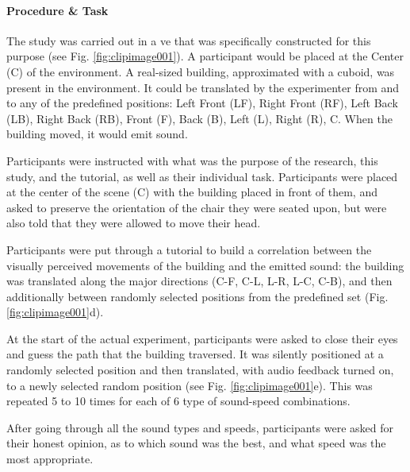\paragraph{Procedure \& Task}
The study was carried out in a \gls{ve} that was specifically constructed for this purpose (see Fig. \ref{fig:clipimage001}). A participant would be placed at the Center (C) of the environment. A real-sized building, approximated with a cuboid, was present in the environment. It could be translated by the experimenter from and to any of the predefined positions: Left Front (LF), Right Front (RF), Left Back (LB), Right Back (RB), Front (F), Back (B), Left (L), Right (R), C. When the building moved, it would emit sound.

Participants were instructed with what was the purpose of the research, this study, and the tutorial, as well as their individual task. Participants were placed at the center of the scene (C) with the building placed in front of them, and asked to preserve the orientation of the chair they were seated upon, but were also told that they were allowed to move their head.

Participants were put through a tutorial to build a correlation between the visually perceived movements of the building and the emitted sound: the building was translated along the major directions (C-F, C-L, L-R, L-C, C-B), and then additionally between randomly selected positions from the predefined set (Fig. \ref{fig:clipimage001}d).

At the start of the actual experiment, participants were asked to close their eyes and guess the path that the building traversed. It was silently positioned at a randomly selected position and then translated, with audio feedback turned on, to a newly selected random position (see Fig. \ref{fig:clipimage001}e). This was repeated 5 to 10 times for each of 6 type of sound-speed combinations.

After going through all the sound types and speeds, participants were asked for their honest opinion, as to which sound was the best, and what speed was the most appropriate.

